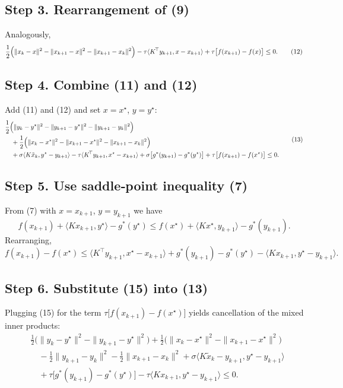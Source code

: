 \documentclass[11pt]{article}
\newcommand{\ip}[2]{\langle #1,#2\rangle}
\begin{document}
\subsection*{Step 3.  Rearrangement of (9)}
Analogously,
\[
\frac12\Bigl(\|x_k-x\|^{2}-\|x_{k+1}-x\|^{2}-\|x_{k+1}-x_k\|^{2}\Bigr)
   -\tau\ip{K^{\!\top}y_{k+1}}{x-x_{k+1}}
   +\tau\bigl[f(x_{k+1})-f(x)\bigr]\le0.
\tag{12}
\]

\subsection*{Step 4.  Combine (11) and (12)}
Add (11) and (12) and set $x=x^{\star}$, $y=y^{\star}$:
\[
\begin{aligned}
&\frac12\Bigl(\|y_k-y^{\star}\|^{2}-\|y_{k+1}-y^{\star}\|^{2}
            -\|y_{k+1}-y_k\|^{2}\Bigr)\\
&\quad+\frac12\Bigl(\|x_k-x^{\star}\|^{2}-\|x_{k+1}-x^{\star}\|^{2}
            -\|x_{k+1}-x_k\|^{2}\Bigr)\\
&\quad+\sigma\ip{K\tilde x_k}{y^{\star}-y_{k+1}}
      -\tau\ip{K^{\!\top}y_{k+1}}{x^{\star}-x_{k+1}}
      +\sigma\bigl[g^{*}(y_{k+1})-g^{*}(y^{\star})\bigr]
      +\tau\bigl[f(x_{k+1})-f(x^{\star})\bigr]\le0.
\end{aligned}
\tag{13}
\]

\subsection*{Step 5.  Use saddle‑point inequality (7)}
From (7) with $x=x_{k+1}$, $y=y_{k+1}$ we have
\[
f(x_{k+1})+ \langle Kx_{k+1},y^{\star}\rangle - g^{*}(y^{\star})
\le
f(x^{\star})+ \langle Kx^{\star},y_{k+1}\rangle - g^{*}(y_{k+1}).
\tag{14}
\]
Rearranging,
\[
f(x_{k+1})-f(x^{\star})\le
\langle K^{\!\top}y_{k+1},x^{\star}-x_{k+1}\rangle
+ g^{*}(y_{k+1})-g^{*}(y^{\star})
- \langle Kx_{k+1},y^{\star}-y_{k+1}\rangle .
\tag{15}
\]

\subsection*{Step 6.  Substitute (15) into (13)}
Plugging (15) for the term $\tau\bigl[f(x_{k+1})-f(x^{\star})\bigr]$ yields cancellation of the mixed inner products:
\[
\begin{aligned}
&\frac12\bigl(\|y_k-y^{\star}\|^{2}-\|y_{k+1}-y^{\star}\|^{2}\bigr)
  +\frac12\bigl(\|x_k-x^{\star}\|^{2}-\|x_{k+1}-x^{\star}\|^{2}\bigr)\\
&\quad-\frac12\|y_{k+1}-y_k\|^{2}
   -\frac12\|x_{k+1}-x_k\|^{2}
   +\sigma\ip{K\tilde x_k-y_{k+1}}{y^{\star}-y_{k+1}}\\
&\quad+\tau\bigl[g^{*}(y_{k+1})-g^{*}(y^{\star})\bigr]
   -\tau\langle Kx_{k+1},y^{\star}-y_{k+1}\rangle\le0.
\end{aligned}
\tag{16}
\]
\end{document}
